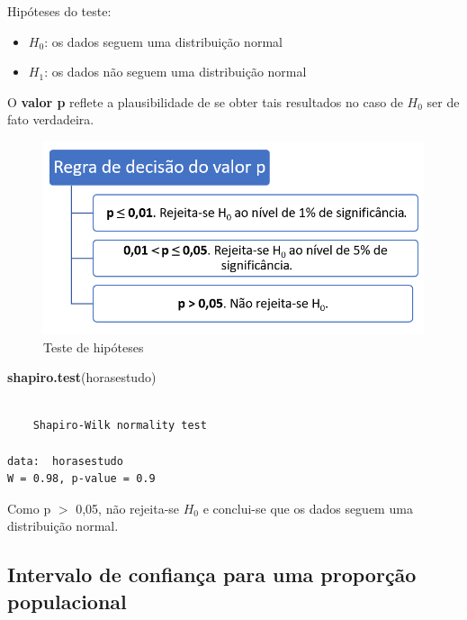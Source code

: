 \documentclass[12pt,brazil,oneside]{book}
\newenvironment{Shaded}{\begin{snugshade}}{\end{snugshade}}
\newcommand{\KeywordTok}[1]{\textcolor[rgb]{0.13,0.29,0.53}{\textbf{#1}}}
\newcommand{\NormalTok}[1]{#1}
\providecommand{\tightlist}{%
  \setlength{\itemsep}{0pt}\setlength{\parskip}{0pt}}
\begin{document}
Hipóteses do teste:

\begin{itemize}
\tightlist
\item
  \textbf{\(H_0\)}: os dados seguem uma distribuição normal
\item
  \textbf{\(H_1\)}: os dados não seguem uma distribuição normal
\end{itemize}

O \textbf{valor p} reflete a plausibilidade de se obter tais resultados no caso de \(H_0\) ser de fato verdadeira.

\begin{figure}[H]

{\centering \includegraphics[width=0.7\linewidth]{testehip1} 

}

\caption{Teste de hipóteses}\label{fig:testehip1}
\end{figure}

\begin{Shaded}
\begin{Highlighting}[]
\KeywordTok{shapiro.test}\NormalTok{(horasestudo)}
\end{Highlighting}
\end{Shaded}

\begin{verbatim}

    Shapiro-Wilk normality test

data:  horasestudo
W = 0.98, p-value = 0.9
\end{verbatim}

Como p \(>\) 0,05, não rejeita-se \(H_0\) e conclui-se que os dados seguem uma distribuição normal.

\hypertarget{intervalo-de-confianca-para-uma-proporcao-populacional}{%
\subsection{Intervalo de confiança para uma proporção populacional}\label{intervalo-de-confianca-para-uma-proporcao-populacional}}
\end{document}
